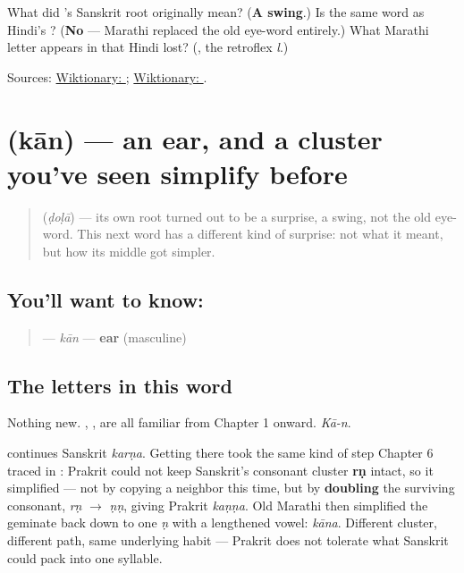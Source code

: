 \begin{tcolorbox}[breakable,colback=teal!4,colframe=teal!35!black,title={Before you move on}]
What did \textbf{}'s Sanskrit root originally mean? (\textbf{A swing}.) Is \textbf{} the same word as Hindi's \textbf{}? (\textbf{No} — Marathi replaced the old eye-word entirely.) What Marathi letter appears in \textbf{} that Hindi lost? (\textbf{}, the retroflex \emph{l}.)

Sources: \href{https://en.wiktionary.org/wiki/\%E0\%A4\%A1\%E0\%A5\%8B\%E0\%A4\%B3\%E0\%A4\%BE}{Wiktionary: }; \href{https://en.wiktionary.org/wiki/\%E0\%A4\%A6\%E0\%A5\%8B\%E0\%A4\%B2}{Wiktionary: }.
\end{tcolorbox}
\section[kān]{ (kān) — an ear, and a cluster you've seen simplify before}

\label{lesson:MR-C12-kaan}



\begin{quote}
\textbf{} (\emph{ḍoḷā}) — its own root turned out to be a surprise, a swing, not the old eye-word. This next word has a different kind of surprise: not what it meant, but how its middle got simpler.
\end{quote}

\subsection*{You'll want to know: }
\begin{quote}
\textbf{} — \emph{kān} — \textbf{ear} (masculine)
\end{quote}

\subsection*{The letters in this word}
Nothing new. \textbf{}, \textbf{}, \textbf{} are all familiar from Chapter 1 onward. \emph{Kā-n}.

\begin{sounds}
\textbf{} continues Sanskrit \textbf{} \emph{karṇa}. Getting there took the same kind of step Chapter 6 traced in \textbf{}: Prakrit could not keep Sanskrit's consonant cluster \textbf{rṇ} intact, so it simplified — not by copying a neighbor this time, but by \textbf{doubling} the surviving consonant, \emph{rṇ} $\to$ \emph{ṇṇ}, giving Prakrit \textbf{} \emph{kaṇṇa}. Old Marathi then simplified the geminate back down to one \emph{ṇ} with a lengthened vowel: \emph{kāna}. Different cluster, different path, same underlying habit — Prakrit does not tolerate what Sanskrit could pack into one syllable.
\end{sounds}

